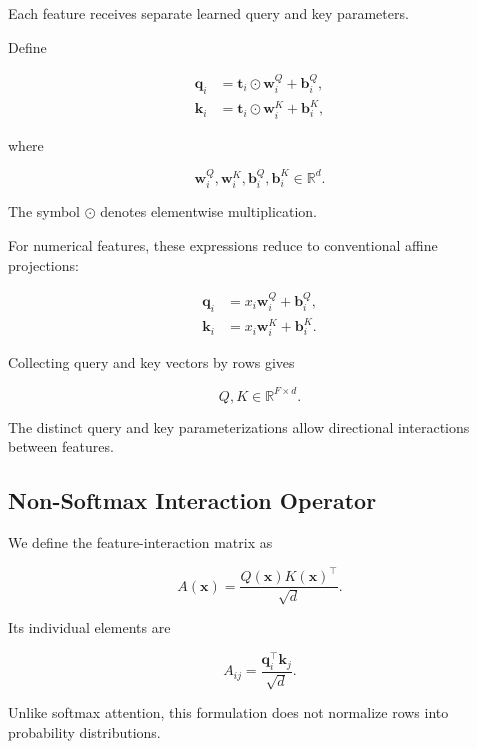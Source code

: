 \documentclass[11pt,a4paper]{article}
\newcommand{\R}{\mathbb{R}}
\newcommand{\od}{\odot}
\begin{document}
Each feature receives separate learned
query and key parameters.

Define

\begin{align}
\mathbf{q}_i
&=
\mathbf{t}_i\od\mathbf{w}_i^Q
+
\mathbf{b}_i^Q,
\\
\mathbf{k}_i
&=
\mathbf{t}_i\od\mathbf{w}_i^K
+
\mathbf{b}_i^K,
\end{align}

where

\begin{equation}
\mathbf{w}_i^Q,\mathbf{w}_i^K,
\mathbf{b}_i^Q,\mathbf{b}_i^K
\in\R^d.
\end{equation}

The symbol $\od$ denotes elementwise
multiplication.

For numerical features, these expressions
reduce to conventional affine projections:

\begin{align}
\mathbf{q}_i
&=
x_i\mathbf{w}_i^Q+\mathbf{b}_i^Q,
\\
\mathbf{k}_i
&=
x_i\mathbf{w}_i^K+\mathbf{b}_i^K.
\end{align}

Collecting query and key vectors by rows gives

\begin{equation}
Q,K\in\R^{F\times d}.
\end{equation}

The distinct query and key parameterizations
allow directional interactions between features.

\subsection{Non-Softmax Interaction Operator}

We define the feature-interaction matrix as

\begin{equation}
\boxed{
A(\mathbf{x})
=
\frac{Q(\mathbf{x})K(\mathbf{x})^\top}
{\sqrt d}.
}
\label{eq:attention}
\end{equation}

Its individual elements are

\begin{equation}
A_{ij}
=
\frac{\mathbf{q}_i^\top\mathbf{k}_j}
{\sqrt d}.
\end{equation}

Unlike softmax attention, this formulation
does not normalize rows into probability
distributions.
\end{document}

